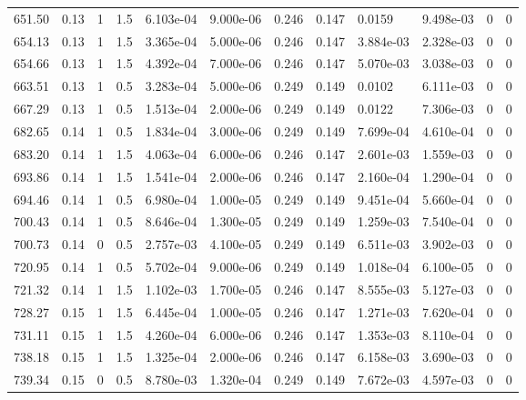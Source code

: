\documentclass[preview]{standalone}
\begin{document}
{{{\begin{tabular}{L{1.2cm}C{1.2cm} C{0.3cm}C{0.5cm} C{1.4cm}C{1.4cm} C{1.4cm}C{1.4cm} C{1.6cm}C{1.6cm} C{1.6cm}C{1.6cm}}
  651.50  &  0.13  & 1     & 1.5 &  6.103e-04  & 9.000e-06  &  0.246&   0.147& 0.0159 & 9.498e-03   &  0 & 0  \\ 
  654.13  &  0.13  & 1     & 1.5 &  3.365e-04  & 5.000e-06  &  0.246&   0.147& 3.884e-03 & 2.328e-03   &  0 & 0  \\ 
  654.66  &  0.13  & 1     & 1.5 &  4.392e-04  & 7.000e-06  &  0.246&   0.147& 5.070e-03 & 3.038e-03   &  0 & 0  \\ 
  663.51  &  0.13  & 1     & 0.5 &  3.283e-04  & 5.000e-06  &  0.249&   0.149& 0.0102 & 6.111e-03   &  0 & 0  \\ 
  667.29  &  0.13  & 1     & 0.5 &  1.513e-04  & 2.000e-06  &  0.249&   0.149& 0.0122 & 7.306e-03   &  0 & 0  \\ 
  682.65  &  0.14  & 1     & 0.5 &  1.834e-04  & 3.000e-06  &  0.249&   0.149& 7.699e-04 & 4.610e-04   &  0 & 0  \\ 
  683.20  &  0.14  & 1     & 1.5 &  4.063e-04  & 6.000e-06  &  0.246&   0.147& 2.601e-03 & 1.559e-03   &  0 & 0  \\ 
  693.86  &  0.14  & 1     & 1.5 &  1.541e-04  & 2.000e-06  &  0.246&   0.147& 2.160e-04 & 1.290e-04   &  0 & 0  \\ 
  694.46  &  0.14  & 1     & 0.5 &  6.980e-04  & 1.000e-05  &  0.249&   0.149& 9.451e-04 & 5.660e-04   &  0 & 0  \\ 
  700.43  &  0.14  & 1     & 0.5 &  8.646e-04  & 1.300e-05  &  0.249&   0.149& 1.259e-03 & 7.540e-04   &  0 & 0  \\ 
  700.73  &  0.14  & 0     & 0.5 &  2.757e-03  & 4.100e-05  &  0.249&   0.149& 6.511e-03 & 3.902e-03   &  0 & 0  \\ 
  720.95  &  0.14  & 1     & 0.5 &  5.702e-04  & 9.000e-06  &  0.249&   0.149& 1.018e-04 & 6.100e-05   &  0 & 0  \\ 
  721.32  &  0.14  & 1     & 1.5 &  1.102e-03  & 1.700e-05  &  0.246&   0.147& 8.555e-03 & 5.127e-03   &  0 & 0  \\ 
  728.27  &  0.15  & 1     & 1.5 &  6.445e-04  & 1.000e-05  &  0.246&   0.147& 1.271e-03 & 7.620e-04   &  0 & 0  \\ 
  731.11  &  0.15  & 1     & 1.5 &  4.260e-04  & 6.000e-06  &  0.246&   0.147& 1.353e-03 & 8.110e-04   &  0 & 0  \\ 
  738.18  &  0.15  & 1     & 1.5 &  1.325e-04  & 2.000e-06  &  0.246&   0.147& 6.158e-03 & 3.690e-03   &  0 & 0  \\ 
  739.34  &  0.15  & 0     & 0.5 &  8.780e-03  & 1.320e-04  &  0.249&   0.149& 7.672e-03 & 4.597e-03   &  0 & 0  \\ 

\end{tabular}}}}
\end{document}
